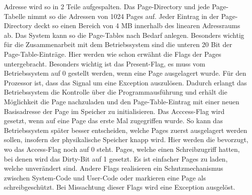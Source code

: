 \documentclass[12pt]{book}
\begin{document}
Adresse wird so in 2 Teile aufgespalten. Das Page-Directory und jede
Page-Tabelle nimmt so die Adressen von 1024 Pages auf. Jeder Eintrag in der
Page-Directory deckt so einen Bereich von 4 MB innerhalb des linearen
Adressraums ab. Das System kann so die Page-Tables nach Bedarf anlegen.
Besonders wichtig für die Zusammenarbeit mit dem Betriebssystem sind die unteren
20 Bit der Page-Table-Einträge. Hier werden wie schon erwähnt die Flags der
Pages untergebracht. Besonders wichtig ist das Present-Flag, es muss vom
Betriebssystem auf 0 gestellt werden, wenn eine Page ausgelagert wurde. Für den
Prozessor ist, dass das Signal um eine Exception auszulösen. Dadurch erlangt das
Betriebssystem die Kontrolle über die Programmausführung und erhält die
Möglichkeit die Page nachzuladen und den Page-Table-Eintrag mit einer neuen
Basisadresse der Page im Speicher zu initialisieren. Das Acccess-Flag wird
gesetzt, wenn auf eine Page das erste Mal zugegriffen wurde. So kann das
Betriebssystem später besser entscheiden, welche Pages zuerst ausgelagert werden
sollen, insofern der physikalische Speicher knapp wird. Hier werden die
bevorzugt, wo das Access-Flag noch auf 0 steht. Pages, welche einen
Schreibzugriff hatten, bei denen wird das Dirty-Bit auf 1 gesetzt. Es ist
einfacher Pages zu laden, welche unverändert sind. Andere Flags realisieren ein
Schutzmechanismus zwischen System-Code und User-Code oder markieren eine Page
als schreibgeschützt. Bei Missachtung dieser Flags wird eine Exception
ausgelöst.
\end{document}
